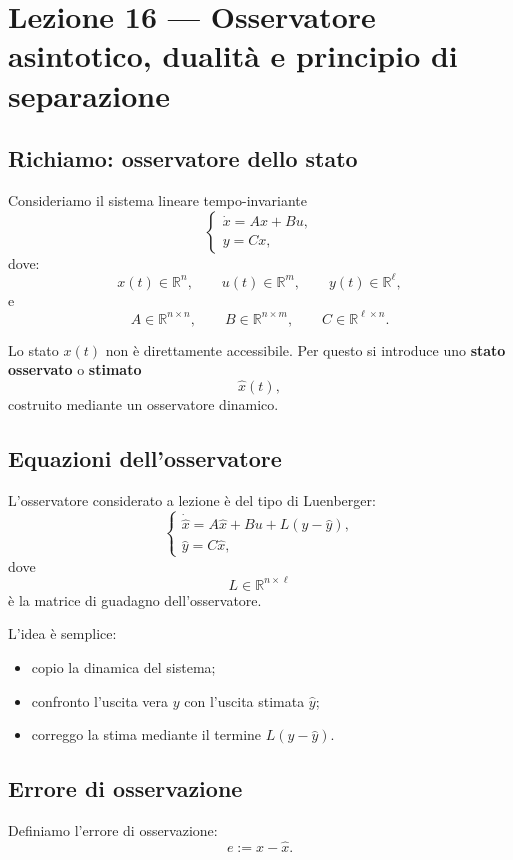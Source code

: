\chapter{Lezione 16 --- Osservatore asintotico, dualità e principio di separazione}

\section{Richiamo: osservatore dello stato}

Consideriamo il sistema lineare tempo-invariante
\[
\begin{cases}
\dot x = Ax + Bu,\\[4pt]
y = Cx,
\end{cases}
\]
dove:
\[
x(t)\in\mathbb{R}^n,\qquad
u(t)\in\mathbb{R}^m,\qquad
y(t)\in\mathbb{R}^\ell,
\]
e
\[
A\in\mathbb{R}^{n\times n},\qquad
B\in\mathbb{R}^{n\times m},\qquad
C\in\mathbb{R}^{\ell\times n}.
\]

Lo stato \(x(t)\) non è direttamente accessibile. Per questo si introduce uno
\textbf{stato osservato} o \textbf{stimato}
\[
\hat x(t),
\]
costruito mediante un osservatore dinamico.

\section{Equazioni dell'osservatore}

L'osservatore considerato a lezione è del tipo di Luenberger:
\[
\begin{cases}
\dot{\hat x} = A\hat x + Bu + L(y-\hat y),\\[4pt]
\hat y = C\hat x,
\end{cases}
\]
dove
\[
L\in\mathbb{R}^{n\times \ell}
\]
è la matrice di guadagno dell'osservatore.

L'idea è semplice:
\begin{itemize}
    \item copio la dinamica del sistema;
    \item confronto l'uscita vera \(y\) con l'uscita stimata \(\hat y\);
    \item correggo la stima mediante il termine \(L(y-\hat y)\).
\end{itemize}

\section{Errore di osservazione}

Definiamo l'errore di osservazione:
\[
e := x-\hat x.
\]

